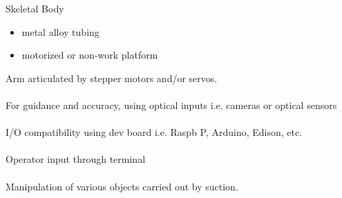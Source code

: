 
Skeletal Body
\begin{itemize}
    \item metal alloy tubing
    \item motorized or non-work platform
\end{itemize}
\smallskip
Arm articulated by stepper motors and/or servos.
\\
\\
For guidance and accuracy, using optical inputs i.e. cameras or optical sensors
\\
\\
I/O compatibility using dev board i.e. Raspb P, Arduino, Edison, etc.
\\
\\
Operator input through terminal
\\
\\
Manipulation of various objects carried out by suction.


